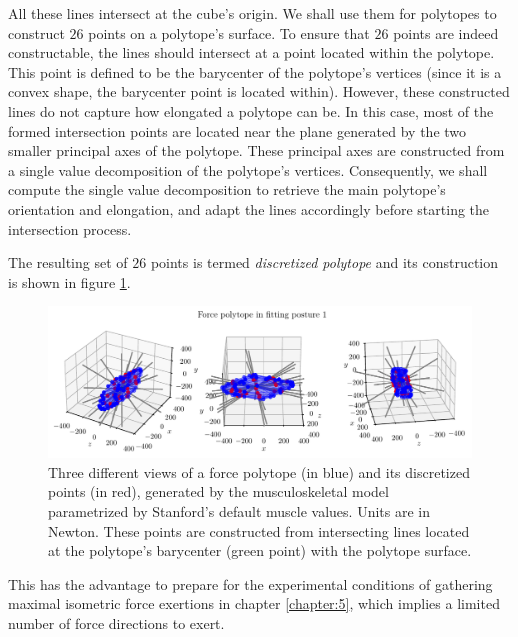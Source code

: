 All these lines intersect at the cube's origin. We shall use them for polytopes to construct $26$ points on a polytope's surface. To ensure that $26$ points are indeed constructable, the lines should intersect at a point located within the polytope. This point is defined to be the barycenter of the polytope's vertices (since it is a convex shape, the barycenter point is located within). However, these constructed lines do not capture how elongated a polytope can be. In this case, most of the formed intersection points are located near the plane generated by the two smaller principal axes of the polytope. These principal axes are constructed from a single value decomposition of the polytope's vertices. Consequently, we shall compute the single value decomposition to retrieve the main polytope's orientation and elongation, and adapt the lines accordingly before starting the intersection process.

The resulting set of $26$ points is termed \emph{discretized polytope} and its construction is shown in figure \ref{fig:polytope_discretization}.

\begin{figure}[!htb]
    \centering
    \captionsetup{justification=centering}
    \begin{minipage}{\linewidth}
        \centering
        \includegraphics[trim={0 0 0 20}, clip, width=1\linewidth]{img/chapter_4/imgs_discretization/STANFORD_POL_POSTURE_FITTING_01.pdf}
    \end{minipage}
    \caption{Three different views of a force polytope (in blue) and its discretized points (in red), generated by the musculoskeletal model parametrized by Stanford's default muscle values. Units are in Newton. These points are constructed from intersecting lines located at the polytope's barycenter (green point) with the polytope surface.}
    \label{fig:polytope_discretization}
\end{figure}

This has the advantage to prepare for the experimental conditions of gathering maximal isometric force exertions in chapter \ref{chapter:5}, which implies a limited number of force directions to exert.


